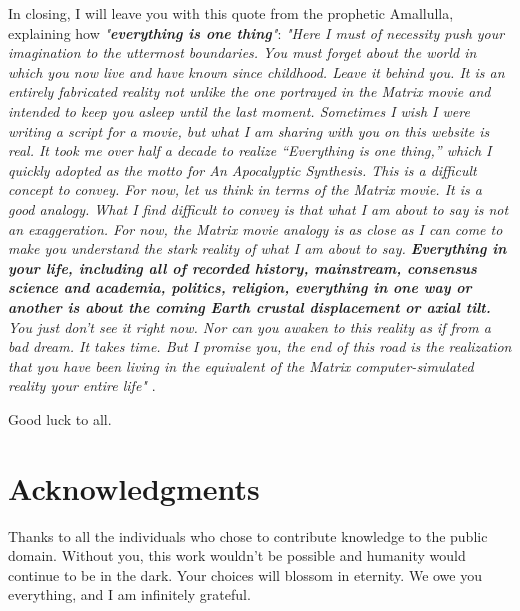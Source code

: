 \documentclass[10pt,twocolumn,letterpaper]{article}
\begin{document}
In closing, I will leave you with this quote from the prophetic Amallulla, explaining how \textit{"\textbf{everything is one thing}"}: \textit{"Here I must of necessity push your imagination to the uttermost boundaries. You must forget about the world in which you now live and have known since childhood. Leave it behind you. It is an entirely fabricated reality not unlike the one portrayed in the Matrix movie and intended to keep you asleep until the last moment. Sometimes I wish I were writing a script for a movie, but what I am sharing with you on this website is real. It took me over half a decade to realize “Everything is one thing,” which I quickly adopted as the motto for An Apocalyptic Synthesis. This is a difficult concept to convey. For now, let us think in terms of the Matrix movie. It is a good analogy. What I find difficult to convey is that what I am about to say is not an exaggeration. For now, the Matrix movie analogy is as close as I can come to make you understand the stark reality of what I am about to say. \textbf{Everything in your life, including all of recorded history, mainstream, consensus science and academia, politics, religion, everything in one way or another is about the coming Earth crustal displacement or axial tilt.} You just don’t see it right now. Nor can you awaken to this reality as if from a bad dream. It takes time. But I promise you, the end of this road is the realization that you have been living in the equivalent of the Matrix computer-simulated reality your entire life"} \cite{33,34}.

Good luck to all.

\section{Acknowledgments}

Thanks to all the individuals who chose to contribute knowledge to the public domain. Without you, this work wouldn't be possible and humanity would continue to be in the dark. Your choices will blossom in eternity. We owe you everything, and I am infinitely grateful.

\clearpage
\twocolumn

{\small


}
\end{document}
